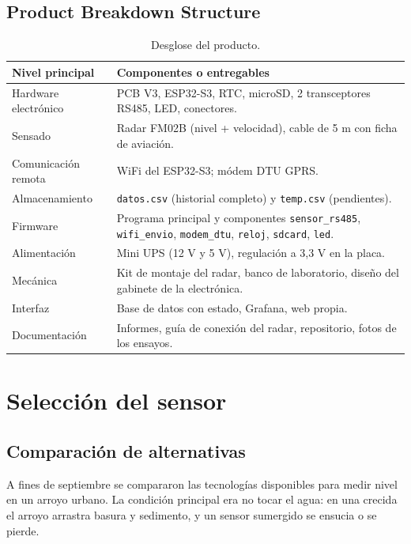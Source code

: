 \documentclass[11pt,a4paper]{article}
\newcommand{\seccion}[1]{\needspace{10\baselineskip}\section{#1}}
\begin{document}
\subsection{Product Breakdown Structure}

\begin{table}[H]
    \centering
    \small
    \caption{Desglose del producto.}
    \begin{tabularx}{\textwidth}{>{\raggedright\arraybackslash}p{3.6cm}L}
        \toprule
        \textbf{Nivel principal} & \textbf{Componentes o entregables} \\
        \midrule
        Hardware electrónico & PCB V3, ESP32-S3, RTC, microSD, 2 transceptores
            RS485, LED, conectores. \\
        Sensado & Radar FM02B (nivel + velocidad), cable de 5 m con ficha de
            aviación. \\
        Comunicación remota & WiFi del ESP32-S3; módem DTU GPRS. \\
        Almacenamiento & \texttt{datos.csv} (historial completo) y
            \texttt{temp.csv} (pendientes). \\
        Firmware & Programa principal y componentes \texttt{sensor\_rs485},
            \texttt{wifi\_envio}, \texttt{modem\_dtu}, \texttt{reloj},
            \texttt{sdcard}, \texttt{led}. \\
        Alimentación & Mini UPS (12 V y 5 V), regulación a 3,3 V en la placa. \\
        Mecánica & Kit de montaje del radar, banco de laboratorio, diseño del
            gabinete de la electrónica. \\
        Interfaz & Base de datos con estado, Grafana, web propia. \\
        Documentación & Informes, guía de conexión del radar, repositorio,
            fotos de los ensayos. \\
        \bottomrule
    \end{tabularx}
\end{table}

\seccion{Selección del sensor}
\label{sec:alternativas}

\subsection{Comparación de alternativas}

A fines de septiembre se compararon las tecnologías disponibles para medir
nivel en un arroyo urbano. La condición principal era no tocar el agua: en una
crecida el arroyo arrastra basura y sedimento, y un sensor sumergido se ensucia
o se pierde.
\end{document}
